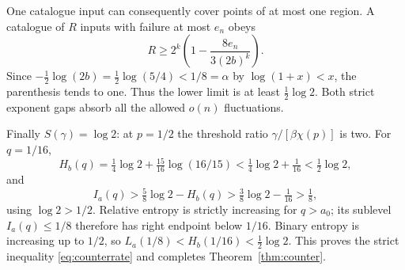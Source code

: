\documentclass[11pt]{amsart}
\theoremstyle{definition}
\theoremstyle{remark}
\numberwithin{equation}{section}
\begin{document}
One catalogue input can consequently cover points of at most one
region. A catalogue of $R$ inputs with failure at most $e_n$ obeys
\begin{equation}\label{eq:cantorcount}
R\ge2^k\left(1-\frac{8e_n}{3(2b)^k}\right).
\end{equation}
Since $-\tfrac12\log(2b)=\tfrac12\log(5/4)<1/8=\alpha$
by $\log(1+x)<x$, the parenthesis tends to one.
Thus the lower limit is at least $\tfrac12\log2$.
Both strict exponent gaps absorb all the allowed $o(n)$ fluctuations.

Finally $S(\gamma)=\log2$: at $p=1/2$ the threshold ratio
$\gamma/[\beta\chi(p)]$ is two. For $q=1/16$,
\[
H_b(q)=\tfrac14\log2+\tfrac{15}{16}\log(16/15)
 <\tfrac14\log2+\tfrac1{16}<\tfrac12\log2,
\]
and
\[
I_a(q)>\tfrac58\log2-H_b(q)
 >\tfrac38\log2-\tfrac1{16}>\tfrac18,
\]
using $\log2>1/2$. Relative entropy is strictly increasing for
$q>a_0$; its sublevel $I_a(q)\le1/8$ therefore has right endpoint
below $1/16$. Binary entropy is increasing up to $1/2$, so
$L_a(1/8)<H_b(1/16)<\tfrac12\log2$.
This proves the strict inequality \eqref{eq:counterrate} and completes
Theorem~\ref{thm:counter}.
\end{document}
